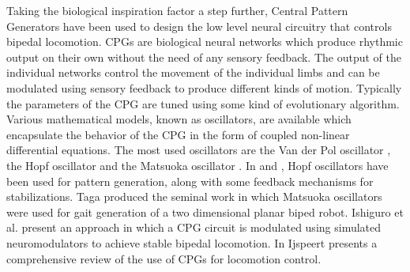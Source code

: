 \documentclass[12pt,twoside]{article}
\theoremstyle{plain}
\theoremstyle{definition}
\theoremstyle{remark}
\newcommand{\forceindent}{\leavevmode{\parindent=2em\indent}}
\begin{document}
\forceindent Taking the biological inspiration factor a step further, Central Pattern Generators have been used to design the low level neural circuitry that controls bipedal locomotion. CPGs are biological neural networks which produce rhythmic output on their own without the need of any sensory feedback. The output of the individual networks control the movement of the individual limbs and can be modulated using sensory feedback to produce different kinds of motion. Typically the parameters of the CPG are tuned using some kind of evolutionary algorithm. Various mathematical models, known as oscillators, are available which encapsulate the behavior of the CPG in the form of coupled non-linear differential equations. The most used oscillators are the Van der Pol oscillator \cite{kanamaru2007van}, the Hopf oscillator \cite{Righetti2006} and the Matsuoka oscillator \cite{Matsuoka1985,Matsuoka1987}. In \cite{Righetti2006} and \cite{Kieboom2009}, Hopf oscillators have been used for pattern generation, along with some feedback mechanisms for stabilizations. Taga \cite{Taga1991} produced the seminal work in which Matsuoka oscillators were used for gait generation of a two dimensional planar biped robot. Ishiguro et al. \cite{Ishiguro2003} present an approach in which a CPG circuit is modulated using simulated neuromodulators to achieve stable bipedal locomotion. In \cite{Ijspeert2008} Ijspeert presents a comprehensive review of the use of CPGs for locomotion control.
\end{document}
